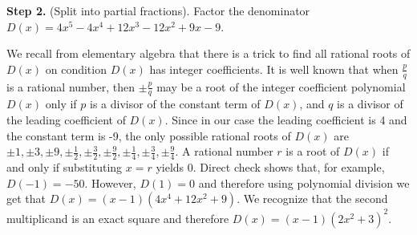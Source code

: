 {\noindent\textbf{Step 2.} (Split into partial fractions). Factor the denominator $D(x)=4x^{5}-4 x^{4}+12 x^{3}-12 x^{2}+9 x-9$. 

We recall from elementary algebra that there is a trick to find all rational roots of $D(x)$ on condition $D(x)$ has integer coefficients. It is well known that when $\frac{p}{q}$ is a rational number, then $\pm \frac{p}{q}$ may be a root of the integer coefficient polynomial $D(x)$ only if $p$ is a divisor of the constant term of $D(x)$, and $q$ is a divisor of the leading coefficient of $D(x)$. Since in our case the leading coefficient is 4 and the constant term is -9, the only possible rational roots of $D(x)$ are $\pm 1, \pm 3, \pm 9, \pm \frac{1}{2}, \pm \frac{3}{2}, \pm \frac{9}{2}, \pm \frac{1}{4}, \pm \frac{3}{4}, \pm \frac{9}{4}$. A rational number $r$ is a root of $D(x)$ if and only if substituting $x=r$ yields 0. Direct check shows that, for example,  $D(-1)=-50$. However, $D(1)=0$ and therefore using polynomial division we get that $D(x)=(x-1)(4x^{4}+12x^{2}+9)$. We recognize that the second multiplicand is an exact square and therefore $D(x)=(x-1)(2x^2+3)^2$.


}
